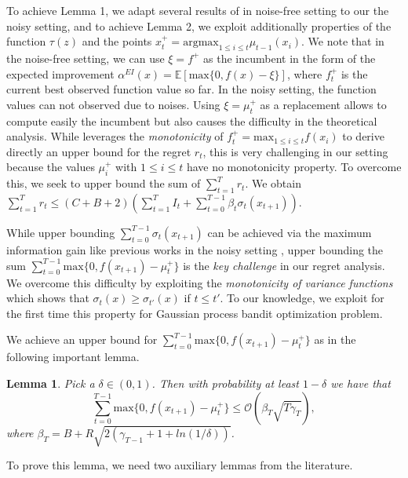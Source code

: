 \documentclass[twoside]{article}
\newtheorem{lemma}{Lemma}
\begin{document}
To achieve Lemma 1, we adapt several results of \citep{Bull11} in noise-free setting to our the noisy setting, and to achieve Lemma 2, we exploit additionally properties of the function $\tau(z)$ and the points $x^+_t = \text{argmax}_{1 \le i \le t}\mu_{t-1}(x_i)$. We note that in the noise-free setting, we can use $\xi = f^+$ as the incumbent in the form of the expected improvement $\alpha^{EI}(x) = \mathbb{E}[\text{max}\{0, f(x) - \xi\}]$, where $f^+_t$ is the current best observed function value so far. In the noisy setting, the function values can not observed due to noises. Using $\xi = \mu^+_t$ as a replacement allows to compute easily the incumbent but also causes the difficulty in the theoretical analysis. While \citet{Bull11} leverages the \emph{monotonicity} of $f^+_t = \text{max}_{1 \le i \le t} f(x_i)$ to derive directly an upper bound for the regret $r_t$, this is very challenging in our setting because the values $\mu^+_i$ with $1 \le i \le t$ have no monotonicity property. To overcome this, we seek to upper bound the sum of $\sum_{t=1}^{T} r_t$. We obtain $\sum_{t=1}^{T} r_t \le (C + B + 2)(\sum_{t=1}^{T} I_t + \sum_{t=0}^{T-1} \beta_t \sigma_{t}(x_{t+1}))$.

While upper bounding $\sum_{t=0}^{T-1}\sigma_{t}(x_{t+1})$ can be achieved via the maximum information gain like previous works in the noisy setting \citep{Srinivas12,Chowdhury17}, upper bounding the sum $\sum_{t=0}^{T-1} \text{max}\{0, f(x_{t+1}) - \mu_t^+\}$ is the \emph{key challenge} in our regret analysis.
We overcome this difficulty by exploiting the \emph{monotonicity of variance functions} \citep{vivarelli} which shows that $\sigma_{t} (x) \ge \sigma_{t'} (x)$ if $t \le t'$. To our knowledge, we exploit for the first time this property for Gaussian process bandit optimization problem.

We achieve an upper bound for $\sum_{t=0}^{T-1} \text{max}\{0, f(x_{t+1}) - \mu_t^+\}$ as in the following important lemma.
\begin{lemma}
Pick a $\delta \in (0,1)$. Then with probability at least $1 - \delta$ we have that
$$\sum_{t=0}^{T-1} \text{max}\{0, f(x_{t+1}) - \mu_t^+\} \le \mathcal O(\beta_T \sqrt{T\gamma_T}),$$
where $\beta_T = B + R\sqrt{2(\gamma_{T-1} + 1 + ln(1/\delta))}$.
\end{lemma}
To prove this lemma, we need two auxiliary lemmas from the literature.
\end{document}
